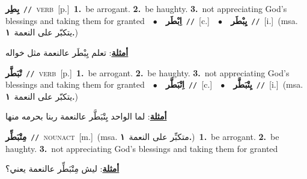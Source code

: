 \documentclass[10pt,a4paper,twoside]{article} %
\begin{document}
\begin{multicols}{2}
{\setlength\topsep{0pt}\textbf{\foreignlanguage{arabic}{بِطِر}}\ {\color{gray}\texttt{//}\color{black}}\ \textsc{verb}\ [p.]\ \textbf{1.}~be arrogant.  \textbf{2.}~be haughty.  \textbf{3.}~not appreciating God's blessings and taking them for granted\ \ $\bullet$\ \ \setlength\topsep{0pt}\textbf{\foreignlanguage{arabic}{اِبْطَر}}\ {\color{gray}\texttt{//}\color{black}}\ [c.]\ \ $\bullet$\ \ \setlength\topsep{0pt}\textbf{\foreignlanguage{arabic}{يِبْطَر}}\ {\color{gray}\texttt{//}\color{black}}\ [i.]\ \color{gray}(msa. \foreignlanguage{arabic}{يتكبّر على النعمة}~\foreignlanguage{arabic}{\textbf{١.}})\color{black}\  \begin{flushright}\color{gray}\foreignlanguage{arabic}{\textbf{\underline{\foreignlanguage{arabic}{أمثلة}}}: تعلم يِبْطَر عالنعمة مثل خواله}\end{flushright}\color{black}} \vspace{2mm}

{\setlength\topsep{0pt}\textbf{\foreignlanguage{arabic}{تْبَطَّر}}\ {\color{gray}\texttt{//}\color{black}}\ \textsc{verb}\ [p.]\ \textbf{1.}~be arrogant.  \textbf{2.}~be haughty.  \textbf{3.}~not appreciating God's blessings and taking them for granted\ \ $\bullet$\ \ \setlength\topsep{0pt}\textbf{\foreignlanguage{arabic}{اِتْبَطَّر}}\ {\color{gray}\texttt{//}\color{black}}\ [c.]\ \ $\bullet$\ \ \setlength\topsep{0pt}\textbf{\foreignlanguage{arabic}{يِتْبَطَّر}}\ {\color{gray}\texttt{//}\color{black}}\ [i.]\ \color{gray}(msa. \foreignlanguage{arabic}{يتكبّر على النعمة}~\foreignlanguage{arabic}{\textbf{١.}})\color{black}\  \begin{flushright}\color{gray}\foreignlanguage{arabic}{\textbf{\underline{\foreignlanguage{arabic}{أمثلة}}}: لما الواحد يِتْبَطَّر عالنعمة ربنا بحرمه منها}\end{flushright}\color{black}} \vspace{2mm}

{\setlength\topsep{0pt}\textbf{\foreignlanguage{arabic}{مِتْبَطِّر}}\ {\color{gray}\texttt{//}\color{black}}\ \textsc{noun\textunderscore act}\ [m.]\ \color{gray}(msa. \foreignlanguage{arabic}{متكبِّر على النعمة}~\foreignlanguage{arabic}{\textbf{١.}})\color{black}\ \textbf{1.}~be arrogant.  \textbf{2.}~be haughty.  \textbf{3.}~not appreciating God's blessings and taking them for granted\  \begin{flushright}\color{gray}\foreignlanguage{arabic}{\textbf{\underline{\foreignlanguage{arabic}{أمثلة}}}: ليش مِتْبَطِّر عالنعمة يعني؟}\end{flushright}\color{black}} \vspace{2mm}


\end{multicols}
\end{document}
